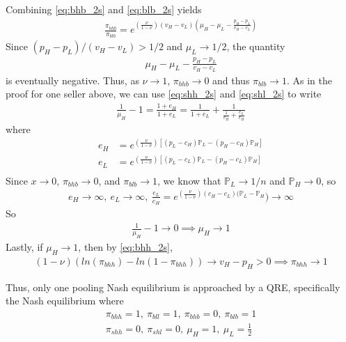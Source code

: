 \documentclass[12pt]{article}
\begin{document}
Combining \ref{eq:bhb_2s} and \ref{eq:blb_2s} yields
\begin{align*}
\frac{\pi_{bhb}}{\pi_{blb}} = e^{\left( \frac{\nu}{1 - \nu} \right) \left( v_H - v_L \right) \left( \mu_H - \mu_L - \frac{p_H - p_L}{v_H - v_L} \right)}
\end{align*}
Since $(p_H - p_L)/(v_H - v_L) > 1/2$ and $\mu_L \to 1/2$, the quantity 
\begin{align*}
\mu_H - \mu_L - \frac{p_H - p_L}{v_H - v_L}
\end{align*}
is eventually negative. Thus, as $\nu \to 1$, $\pi_{bhb} \to 0$ and thus $\pi_{blb} \to 1$. As in the proof for one seller above, we can use \ref{eq:shh_2s} and \ref{eq:shl_2s} to write
\begin{align*}
\frac{1}{\mu_H} - 1 = \frac{1 + e_H}{1 + e_L} = \frac{1}{1 + e_L} + \frac{1}{\frac{1}{e_H} + \frac{e_L}{e_H}}
\end{align*}
where
\begin{align*}
e_H &= e^{\left( \frac{\nu}{1 - \nu} \right) \left[ (p_L - c_H) \mathbb{P}_L - (p_H - c_H) \mathbb{P}_H \right]} \\
e_L &= e^{\left( \frac{\nu}{1 - \nu} \right) \left[ (p_L - c_L) \mathbb{P}_L - (p_H - c_L) \mathbb{P}_H \right]} \\
\end{align*}
Since $x \to 0$, $\pi_{bhb} \to 0$, and $\pi_{blb} \to 1$, we know that $\mathbb{P}_L \to 1/n$ and $\mathbb{P}_H \to 0$, so 
\begin{align*}
e_H \to \infty, \ e_L \to \infty, \ \frac{e_L}{e_H} = e^{\left( \frac{\nu}{1 - \nu} \right) (c_H - c_L) (\mathbb{P}_L - \mathbb{P}_H}) \to \infty
\end{align*}
So 
\begin{align*}
\frac{1}{\mu_H} - 1 \to 0 \implies \mu_H \to 1
\end{align*}
Lastly, if $\mu_H \to 1$, then by \ref{eq:bhh_2s},
\begin{align*}
(1 - \nu) \left( ln \left( \pi_{bhh} \right) - ln \left( 1 - \pi_{bhh} \right) \right) \to v_H - p_H > 0 \implies \pi_{bhh} \to 1
\end{align*}

Thus, only one pooling Nash equilibrium is approached by a QRE, specifically the Nash equilibrium where
\begin{align*}
\pi_{bhh} = 1 , \ \pi_{bll} = 1 , \ \pi_{bhb} = 0 , \ \pi_{blb} = 1 \\
\pi_{shh} = 0 , \ \pi_{shl} = 0 , \ \mu_H = 1 , \ \mu_L = \frac{1}{2} \\
\end{align*}
\end{document}
